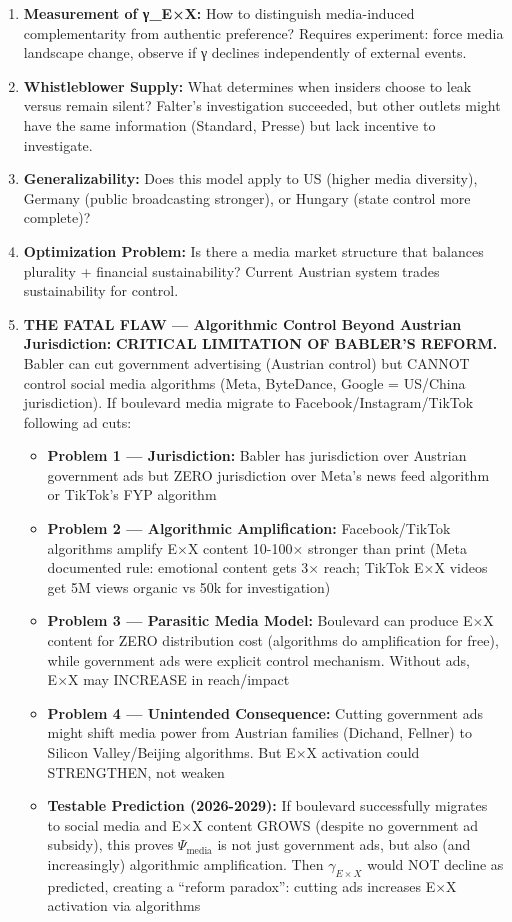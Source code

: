 \begin{enumerate}
\item \textbf{Measurement of γ_{E×X}:} How to distinguish media-induced complementarity
  from authentic preference? Requires experiment: force media landscape change,
  observe if γ declines independently of external events.

\item \textbf{Whistleblower Supply:} What determines when insiders choose to leak
  versus remain silent? Falter's investigation succeeded, but other outlets might
  have the same information (Standard, Presse) but lack incentive to investigate.

\item \textbf{Generalizability:} Does this model apply to US (higher media diversity),
  Germany (public broadcasting stronger), or Hungary (state control more complete)?

\item \textbf{Optimization Problem:} Is there a media market structure that balances
  plurality + financial sustainability? Current Austrian system trades sustainability
  for control.

\item \textbf{THE FATAL FLAW — Algorithmic Control Beyond Austrian Jurisdiction:}
  \textbf{CRITICAL LIMITATION OF BABLER'S REFORM.} Babler can cut government advertising
  (Austrian control) but CANNOT control social media algorithms (Meta, ByteDance, Google
  = US/China jurisdiction). If boulevard media migrate to Facebook/Instagram/TikTok
  following ad cuts:
  \begin{itemize}
  \item \textbf{Problem 1 — Jurisdiction:} Babler has jurisdiction over Austrian government ads
    but ZERO jurisdiction over Meta's news feed algorithm or TikTok's FYP algorithm
  \item \textbf{Problem 2 — Algorithmic Amplification:} Facebook/TikTok algorithms amplify
    E×X content 10-100× stronger than print (Meta documented rule: emotional content gets
    3× reach; TikTok E×X videos get 5M views organic vs 50k for investigation)
  \item \textbf{Problem 3 — Parasitic Media Model:} Boulevard can produce E×X content
    for ZERO distribution cost (algorithms do amplification for free), while government
    ads were explicit control mechanism. Without ads, E×X may INCREASE in reach/impact
  \item \textbf{Problem 4 — Unintended Consequence:} Cutting government ads might shift
    media power from Austrian families (Dichand, Fellner) to Silicon Valley/Beijing
    algorithms. But E×X activation could STRENGTHEN, not weaken
  \item \textbf{Testable Prediction (2026-2029):} If boulevard successfully migrates to
    social media and E×X content GROWS (despite no government ad subsidy), this proves
    $\Psi_{\text{media}}$ is not just government ads, but also (and increasingly)
    algorithmic amplification. Then $\gamma_{E \times X}$ would NOT decline as predicted,
    creating a ``reform paradox'': cutting ads increases E×X activation via algorithms
  \end{itemize}


\end{enumerate}
